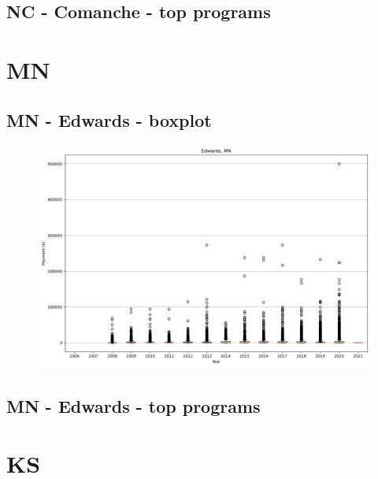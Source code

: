 \subsection*{NC - Comanche - top programs}

\newpage
\section*{MN}
\subsection*{MN - Edwards - boxplot}
\begin{figure}[h]
\centering
\includegraphics[width=7in]{../output/boxplots/counties/Edwards-MN_boxplot.png}
\end{figure}


\subsection*{MN - Edwards - top programs}

\newpage
\section*{KS}
